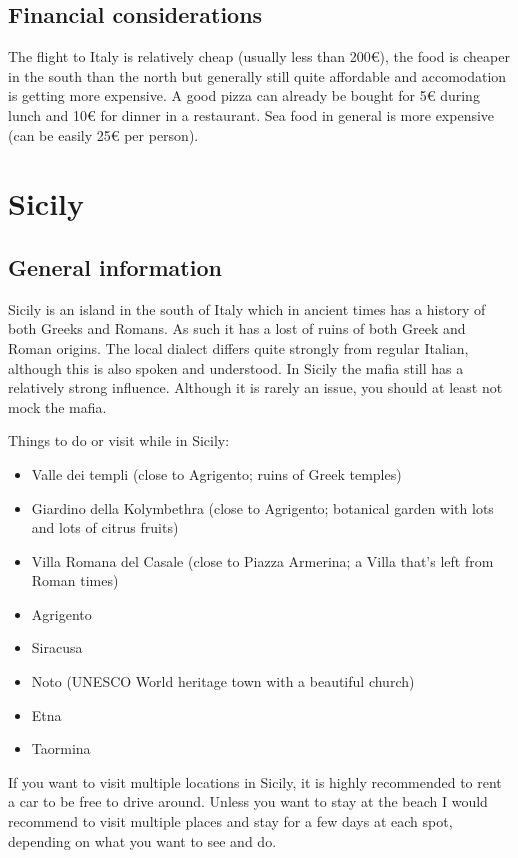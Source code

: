 \documentclass[11pt,a4paper,sans,english]{article}
\begin{document}
\subsection{Financial considerations}
The flight to Italy is relatively cheap (usually less than 200€), the food is cheaper in the south than the north but generally still quite affordable and accomodation is getting more expensive. A good pizza can already be bought for 5€ during lunch and 10€ for dinner in a restaurant. Sea food in general is more expensive (can be easily 25€ per person).
\section{Sicily}
\subsection{General information}
Sicily is an island in the south of Italy which in ancient times has a history of both Greeks and Romans. As such it has a lost of ruins of both Greek and Roman origins. The local dialect differs quite strongly from regular Italian, although this is also spoken and understood. In Sicily the mafia still has a relatively strong influence. Although it is rarely an issue, you should at least not mock the mafia.

Things to do or visit while in Sicily:
\begin{itemize}
	\itemsep-0.5em 
	\item Valle dei templi (close to Agrigento; ruins of Greek temples)
	\item Giardino della Kolymbethra (close to Agrigento; botanical garden with lots and lots of citrus fruits)
	\item Villa Romana del Casale (close to Piazza Armerina; a Villa that's left from Roman times)
	\item Agrigento 
	\item Siracusa
	\item Noto (UNESCO World heritage town with a beautiful church)
	\item Etna
	\item Taormina
\end{itemize}
If you want to visit multiple locations in Sicily, it is highly recommended to rent a car to be free to drive around. Unless you want to stay at the beach I would recommend to visit multiple places and stay for a few days at each spot, depending on what you want to see and do.
\end{document}
